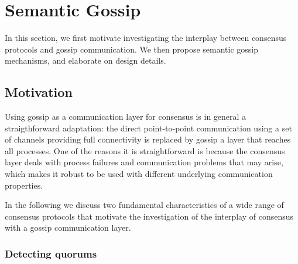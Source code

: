 \section{Semantic Gossip}
\label{sec:semantic}

In this section, we first motivate investigating the interplay between consensus protocols and gossip communication. We then propose semantic gossip mechanisms, and elaborate on design details.










\subsection{Motivation}
\label{sec:motivation}

Using gossip as a communication layer for consensus is in general a straigthforward adaptation:
the direct point-to-point communication using a set of channels providing full connectivity
is replaced by gossip a layer that reaches all processes.  
%
One of the reasons it is straightforward is because the consensus layer deals with process failures and communication problems that may arise, which makes it robust  to be used with different underlying communication properties.    

In the following we discuss two fundamental characteristics of a wide range of consensus protocols
that motivate the investigation of the interplay of consensus with a gossip communication layer.

\subsubsection{Detecting quorums}
\label{redundant}

